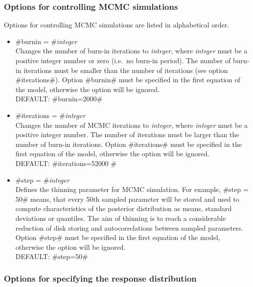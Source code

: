 \vspace{0.4cm}

\subsubsection*{Options for controlling MCMC simulations}
\label{mcmc_options}

Options for controlling MCMC simulations are listed in
alphabetical order.

\begin{itemize}
\item #burnin = #{\em integer } \\
Changes the number of burn-in iterations to {\em integer}, where
{\em integer} must be a positive integer number or zero (i.e.~no
burn-in period).
The number of burn-in iterations must be smaller than the number of iterations (see option #iterations#).
Option #burnin# must be specified in the first equation of the model, otherwise the option will be ignored. \\
DEFAULT: #burnin=2000#

\item #iterations = #{\em integer } \\
Changes the number of MCMC iterations to {\em integer}, where {\em
integer} must be a positive integer number. The number of
iterations must be larger than the
number of burn-in iterations.
Option #iterations# must be specified in the first equation of the model, otherwise the option will be ignored. \\
DEFAULT: #iterations=52000 #

\item #step = #{\em integer} \\
Defines the thinning parameter for MCMC simulation. For example,
#step = 50# means, that every 50th sampled parameter will be
stored and used to compute characteristics of the posterior
distribution as means, standard deviations or quantiles. The aim
of thinning is to reach a considerable reduction of disk storing
and autocorrelations between sampled parameters.
Option #step# must be specified in the first equation of the model, otherwise the option will be ignored. \\
DEFAULT: #step=50#

\end{itemize}

\subsubsection*{Options for specifying the response distribution}

